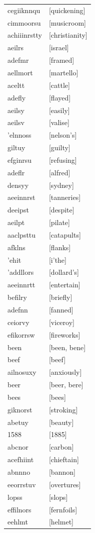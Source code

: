 \documentclass{article}
\begin{document}
\begin{tabular}{ll}
cegiiknnqu & [quickening] \\
cimmoorsu & [musicroom] \\
achiiinrstty & [christianity] \\
aeilrs & [israel] \\
adefmr & [framed] \\
aellmort & [martello] \\
aceltt & [cattle] \\
adefly & [flayed] \\
aeilsy & [easily] \\
aeilsv & [valise] \\
'elnnoss & [nelson's] \\
giltuy & [guilty] \\
efginrsu & [refusing] \\
adeflr & [alfred] \\
densyy & [sydney] \\
aeeinnrst & [tanneries] \\
deeipst & [despite] \\
aeilpt & [pilate] \\
aaclpsttu & [catapults] \\
afklns & [flanks] \\
'ehit & [i'the] \\
'addllors & [dollard's] \\
aeeinnrtt & [entertain] \\
befilry & [briefly] \\
adefnn & [fanned] \\
ceiorvy & [viceroy] \\
efikorrsw & [fireworks] \\
been & [been, bene] \\
beef & [beef] \\
ailnosuxy & [anxiously] \\
beer & [beer, bere] \\
bees & [bees] \\
giknorst & [stroking] \\
abetuy & [beauty] \\
1588 & [1885] \\
abcnor & [carbon] \\
acefhiint & [chieftain] \\
abnnno & [bannon] \\
eeorrstuv & [overtures] \\
lopss & [slops] \\
effilnors & [fernfoils] \\
eehlmt & [helmet] \\

\end{tabular}
\end{document}
